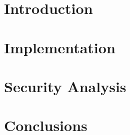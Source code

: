 

\chapter{Introduction}\label{chapter:introduction} %

\chapter{Implementation}\label{chapter:method}


\chapter{Security Analysis}\label{chapter:results}


\chapter{Conclusions}\label{chapter:discussion}


